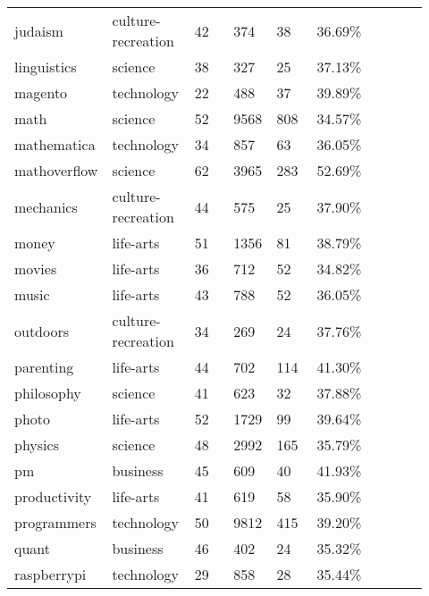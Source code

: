 \begin{longtabu}{@{}
	p{0.17\linewidth}
	p{0.2\linewidth}
	P{0.1\linewidth}
	P{0.1\linewidth}
	P{0.1\linewidth}
	P{0.1\linewidth}
	p{0.15\linewidth}@{}}
judaism          & culture-recreation & 42    & 374              & 38      & 36.69\%     \\
linguistics      & science            & 38    & 327              & 25      & 37.13\%     \\
magento          & technology         & 22    & 488              & 37      & 39.89\%     \\
math             & science            & 52    & 9568             & 808     & 34.57\%     \\
mathematica      & technology         & 34    & 857              & 63      & 36.05\%     \\
mathoverflow     & science            & 62    & 3965             & 283     & 52.69\%     \\
mechanics        & culture-recreation & 44    & 575              & 25      & 37.90\%     \\
money            & life-arts          & 51    & 1356             & 81      & 38.79\%     \\
movies           & life-arts          & 36    & 712              & 52      & 34.82\%     \\
music            & life-arts          & 43    & 788              & 52      & 36.05\%     \\
outdoors         & culture-recreation & 34    & 269              & 24      & 37.76\%     \\
parenting        & life-arts          & 44    & 702              & 114     & 41.30\%     \\
philosophy       & science            & 41    & 623              & 32      & 37.88\%     \\
photo            & life-arts          & 52    & 1729             & 99      & 39.64\%     \\
physics          & science            & 48    & 2992             & 165     & 35.79\%     \\
pm               & business           & 45    & 609              & 40      & 41.93\%     \\
productivity     & life-arts          & 41    & 619              & 58      & 35.90\%     \\
programmers      & technology         & 50    & 9812             & 415     & 39.20\%     \\
quant            & business           & 46    & 402              & 24      & 35.32\%     \\
raspberrypi      & technology         & 29    & 858              & 28      & 35.44\%     \\

\end{longtabu}
